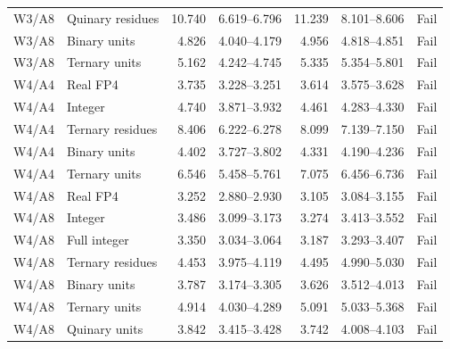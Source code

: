 \documentclass[11pt]{article}
\begin{document}
\begin{table}[p]
\begin{tabular}{llrrrrl}
W3/A8 & Quinary residues & 10.740 & 6.619--6.796 & 11.239 & 8.101--8.606 & Fail \\
W3/A8 & Binary units & 4.826 & 4.040--4.179 & 4.956 & 4.818--4.851 & Fail \\
W3/A8 & Ternary units & 5.162 & 4.242--4.745 & 5.335 & 5.354--5.801 & Fail \\
W4/A4 & Real FP4 & 3.735 & 3.228--3.251 & 3.614 & 3.575--3.628 & Fail \\
W4/A4 & Integer & 4.740 & 3.871--3.932 & 4.461 & 4.283--4.330 & Fail \\
W4/A4 & Ternary residues & 8.406 & 6.222--6.278 & 8.099 & 7.139--7.150 & Fail \\
W4/A4 & Binary units & 4.402 & 3.727--3.802 & 4.331 & 4.190--4.236 & Fail \\
W4/A4 & Ternary units & 6.546 & 5.458--5.761 & 7.075 & 6.456--6.736 & Fail \\
W4/A8 & Real FP4 & 3.252 & 2.880--2.930 & 3.105 & 3.084--3.155 & Fail \\
W4/A8 & Integer & 3.486 & 3.099--3.173 & 3.274 & 3.413--3.552 & Fail \\
W4/A8 & Full integer & 3.350 & 3.034--3.064 & 3.187 & 3.293--3.407 & Fail \\
W4/A8 & Ternary residues & 4.453 & 3.975--4.119 & 4.495 & 4.990--5.030 & Fail \\
W4/A8 & Binary units & 3.787 & 3.174--3.305 & 3.626 & 3.512--4.013 & Fail \\
W4/A8 & Ternary units & 4.914 & 4.030--4.289 & 5.091 & 5.033--5.368 & Fail \\
W4/A8 & Quinary units & 3.842 & 3.415--3.428 & 3.742 & 4.008--4.103 & Fail \\
\bottomrule
\end{tabular}
\end{table}
\end{document}
